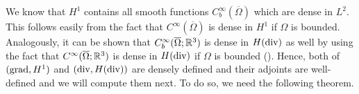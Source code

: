 \documentclass[../master_thesis.tex]{subfiles}
\begin{document}
    



We know that $H^1$ contains all smooth functions 
$C_b^\infty(\overline{\Omega})$ which are dense in $L^2$. This follows easily 
from the fact that $C^\infty(\overline{\Omega})$ is dense in $H^1$ if $\Omega$ is bounded.
Analogously,
it can be shown that $C_b^\infty(\overline{\Omega};\mathbb{R}^3)$ is dense in $H(\operatorname{div})$ as well 
by using the fact that $C^\infty(\overline{\Omega};\mathbb{R}^3)$ is dense in $H(\operatorname{div})$ if $\Omega$
is bounded (\cite[Thm. 3.22]{monk}).
Hence, 
both of $(\operatorname{grad},H^1)$ and $(\operatorname{div},H(\operatorname{div}))$ are densely defined and 
their adjoints are well-defined and we will compute them next. To do so, 
we need the following theorem.
\end{document}
